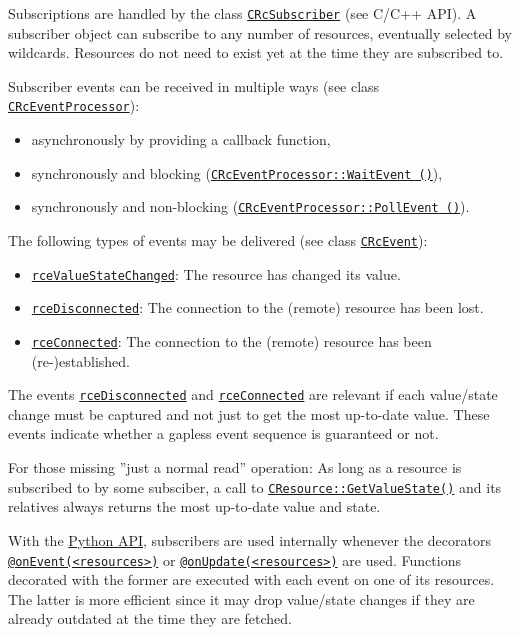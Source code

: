 \documentclass[12pt,english,parskip=half,headheight=19pt]{scrreprt}
\newcommand{\refdoc}[2]{\href{#1}{#2}}              %
\newcommand{\refapic}[1]{\href{home2l-api_c/index.html}{\mbox{\texttt{#1}}}}            %
\newcommand{\refapipython}[1]{\href{home2l-api_python/index.html}{\mbox{\texttt{#1}}}}  %
\newcommand{\theapipython}{\refdoc{home2l-api_python/index.html}{Python API}}
\begin{document}
Subscriptions are handled by the class \refapic{CRcSubscriber} (see C/C++
API). A subscriber object can subscribe to any number of resources,
eventually selected by wildcards. Resources do not need to exist yet at
the time they are subscribed to.

Subscriber events can be received in multiple ways (see class \refapic{CRcEventProcessor}):

\begin{itemize}
  \item
    asynchronously by providing a callback function,
  \item
    synchronously and blocking (\refapic{CRcEventProcessor::WaitEvent ()}),
  \item
    synchronously and non-blocking (\refapic{CRcEventProcessor::PollEvent ()}).
\end{itemize}

The following types of events may be delivered (see class \refapic{CRcEvent}):

\begin{itemize}
  \item
    \refapic{rceValueStateChanged}: The resource has changed its value.
  \item
    \refapic{rceDisconnected}: The connection to the (remote) resource has been lost.
  \item
    \refapic{rceConnected}: The connection to the (remote) resource has been (re-)established.
\end{itemize}

The events \refapic{rceDisconnected} and \refapic{rceConnected} are relevant if each value/state change must be captured and not just to get the most up-to-date value. These events indicate whether a gapless event sequence is guaranteed or not.

For those missing ''just a normal read'' operation: As long as a resource is subscribed to by some subsciber, a call to \refapic{CResource::GetValueState()} and its relatives always returns the most up-to-date value and state.

With the \theapipython{}, subscribers are used internally whenever the decorators \refapipython{@onEvent(<resources>)} or \refapipython{@onUpdate(<resources>)} are used. Functions decorated with the former are executed with each event on one of its resources. The latter is more efficient since it may drop value/state changes if they are already outdated at the time they are fetched.
\end{document}
